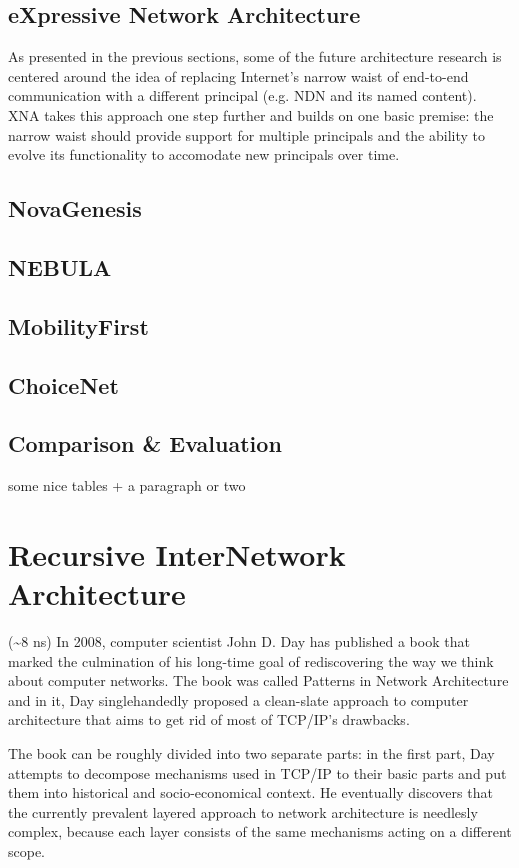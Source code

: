     \section{eXpressive Network Architecture}
        As presented in the previous sections, some of the future architecture research is centered around the idea of replacing Internet's narrow waist of end-to-end communication with a different principal (e.g. NDN and its named content). XNA takes this approach one step further and builds on one basic premise: the narrow waist should provide support for multiple principals and the ability to evolve its functionality to accomodate new principals over time.

    \section{NovaGenesis}
    \section{NEBULA}
    \section{MobilityFirst}
    \section{ChoiceNet}
    \section{Comparison \& Evaluation}
        some nice tables + a paragraph or two


\chapter{Recursive InterNetwork Architecture}
    (\textasciitilde8 ns)
    In 2008, computer scientist John D. Day has published a book that marked the culmination of his long-time goal of rediscovering the way we think about computer networks. The book was called Patterns in Network Architecture and in it, Day singlehandedly proposed a clean-slate approach to computer architecture that aims to get rid of most of TCP/IP's drawbacks.

    The book can be roughly divided into two separate parts: in the first part, Day attempts to decompose mechanisms used in TCP/IP to their basic parts and put them into historical and socio-economical context. He eventually discovers that the currently prevalent layered approach to network architecture is needlesly complex, because each layer consists of the same mechanisms acting on a different scope.


